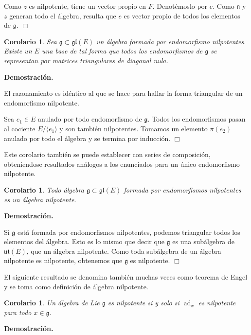 \documentclass[a4paper,draft,12pt]{scrartcl}
\newtheorem{cor}[teo]{Corolario}%
\newcommand{\dem}{\noindent \textbf{Demostración. }\vspace{0.3 cm}}%
\newcommand{\g}{\mathfrak{g}}%
\newcommand{\fin}{ $\Box $ \vspace{0.4 cm}}
\DeclareMathOperator{\ad}{ad}  %
\begin{document}
Como $z$ es nilpotente, tiene un vector propio en $F$.  Denotémoslo por $e$. Como $\mathfrak{n}$ y $z$ generan todo el álgebra, resulta que $e$ es vector propio de todos los elementos de $\g$.  \fin 

\begin{cor}

Sea $\g \subset \mathfrak{gl}(E)$ un álgebra formada por endomorfismo nilpotentes.  Existe un $E$ una base de tal forma que todos los endomorfismos de $\g$ se representan por matrices triangulares de diagonal nula.

\end{cor}

\dem

El razonamiento es idéntico al que se hace para hallar la forma triangular de un endomorfismo nilpotente.

Sea $e_1 \in E$ anulado por todo endomorfismo de $\g$.  Todos los endomorfismos pasan al cociente $E/\langle e_1\rangle$ y son también nilpotentes.  Tomamos un elemento $\pi(e_2)$ anulado por todo el álgebra y se termina por inducción.  \fin

Este corolario también se puede establecer con series de composición, obteniendose resultados análogos a los enunciados para un único endomorfismo nilpotente.

\begin{cor}

Todo álgebra $\g \subset \mathfrak{gl}(E)$ formada por endomorfismos nilpotentes es un álgebra nilpotente.

\end{cor}

\dem

Si $\g$ está formada por endomorfismos nilpotentes, podemos triangular todos los elementos del álgebra.  Esto es lo mismo que decir que $\g$ es una subálgebra de $\mathfrak{ut}(E)$, que un álgebra nilpotente.  Como toda subálgebra de un álgebra nilpotente es nilpotente, obtenemos que $\g$ es nilpotente.  \fin

El siguiente resultado se denomina también muchas veces como teorema de Engel y se toma como definición de álgebra nilpotente.

\begin{cor}

Un álgebra de Lie $\g$ es nilpotente si y solo si $\ad_x$ es nilpotente para todo $x \in \g$.

\end{cor}

\dem
\end{document}
